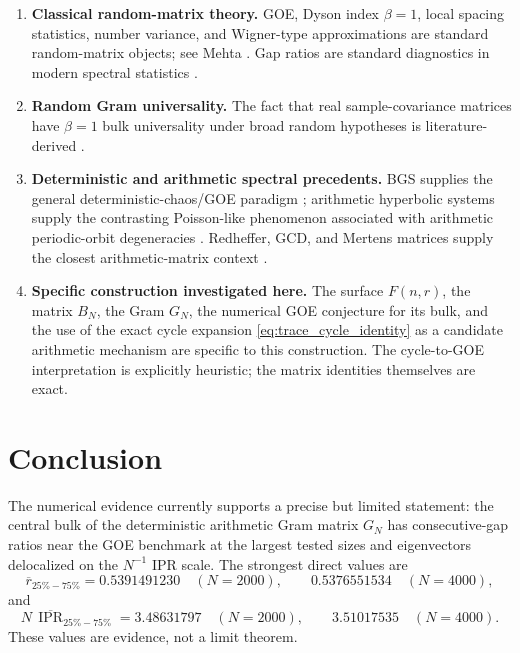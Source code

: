 \documentclass[11pt]{amsart}
\numberwithin{equation}{section}
\theoremstyle{plain}
\theoremstyle{definition}
\theoremstyle{remark}
\newcommand{\IPR}{\operatorname{IPR}}
\begin{document}
\begin{enumerate}[label=(\roman*)]
\item \textbf{Classical random-matrix theory.}  GOE, Dyson index $\beta=1$, local spacing statistics, number variance, and Wigner-type approximations are standard random-matrix objects; see Mehta \cite{Mehta2004}.  Gap ratios are standard diagnostics in modern spectral statistics \cite{OganesyanHuse2007,Atas2013}.

\item \textbf{Random Gram universality.}  The fact that real sample-covariance matrices have $\beta=1$ bulk universality under broad random hypotheses is literature-derived \cite{TaoVu2012,PillaiYin2014}.

\item \textbf{Deterministic and arithmetic spectral precedents.}  BGS supplies the general deterministic-chaos/GOE paradigm \cite{BGS1984}; arithmetic hyperbolic systems supply the contrasting Poisson-like phenomenon associated with arithmetic periodic-orbit degeneracies \cite{BogomolnyEtAl1992,LuoSarnak1994}.  Redheffer, GCD, and Mertens matrices supply the closest arithmetic-matrix context \cite{BarrettJarvis1992,HongLoewy2004,Cardinal2010,ClementSteinerberger2025,Kline2019,Kline2020}.

\item \textbf{Specific construction investigated here.}  The surface $F(n,r)$, the matrix $B_N$, the Gram $G_N$, the numerical GOE conjecture for its bulk, and the use of the exact cycle expansion \eqref{eq:trace_cycle_identity} as a candidate arithmetic mechanism are specific to this construction.  The cycle-to-GOE interpretation is explicitly heuristic; the matrix identities themselves are exact.
\end{enumerate}

\section{Conclusion}
\label{sec:conclusion}

The numerical evidence currently supports a precise but limited statement: the central bulk of the deterministic arithmetic Gram matrix $G_N$ has consecutive-gap ratios near the GOE benchmark at the largest tested sizes and eigenvectors delocalized on the $N^{-1}$ IPR scale.  The strongest direct values are
\begin{equation}
\overline r_{25\%-75\%}
=0.5391491230\quad(N=2000),
\qquad
0.5376551534\quad(N=4000),
\label{eq:conclusion_gap_ratio}
\end{equation}
and
\begin{equation}
N\,\overline{\IPR}_{25\%-75\%}
=3.48631797\quad(N=2000),
\qquad
3.51017535\quad(N=4000).
\label{eq:conclusion_ipr}
\end{equation}
These values are evidence, not a limit theorem.
\end{document}
